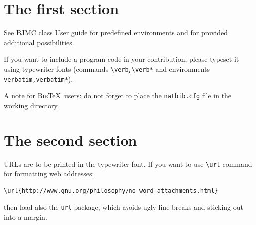 \documentclass{bjmc}   %
\begin{document}
%
%
%

\maketitle      %

\begin{abstract} 
Insert your abstract here. Do not use abbreviations (unless they are generally known) or cite references in the abstract. 
Give three to ten keywords representing the main content of the article
\end{abstract}
%
%
\section{The first section}

See BJMC class User guide for predefined environments and for provided additional possibilities.

If you want to include a program code in your contribution, please typeset it using typewriter fonts (commands \verb|\verb,\verb*| and environments \verb|verbatim,verbatim*|).

A note for \textsc{Bib}\TeX\ users: do not forget to place the \verb|natbib.cfg| file in the working directory.

\section{The second section} 
URLs are to be printed in the typewriter font. If you want to use  \verb|\url| command for formatting web addresses:
\begin{verbatim}
\url{http://www.gnu.org/philosophy/no-word-attachments.html}
\end{verbatim} 
then load also the \verb|url| package, which avoids ugly line breaks and sticking out into a margin. 
\end{document}
